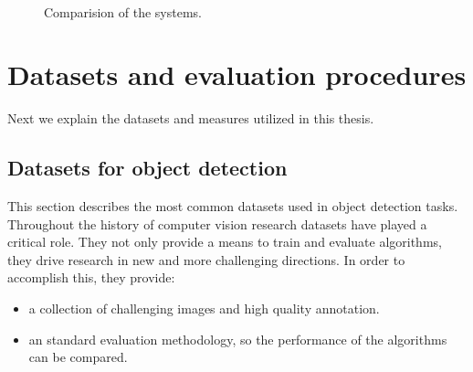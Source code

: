 \documentclass[12pt, a4paper, titlepage,twoside,openright]{article}
\begin{document}
\begin{figure}[H]
		
\centering

\\

\caption{Comparision of the systems.}
\label{lossesSiam2}
\end{figure}





\section{Datasets and evaluation procedures}

Next we explain the datasets and measures utilized in this thesis.

\subsection{Datasets for object detection}

This section describes the most common datasets used in object detection tasks. Throughout the history of computer vision research datasets have played a critical role.  They not only provide a means to train and evaluate algorithms, they drive research in new and more challenging directions. In order to accomplish this, they provide:


\begin{itemize}

\item a collection of challenging images and high quality annotation.

\item an standard evaluation methodology, so the performance of the algorithms can be compared. 


\end{itemize}
\end{document}
